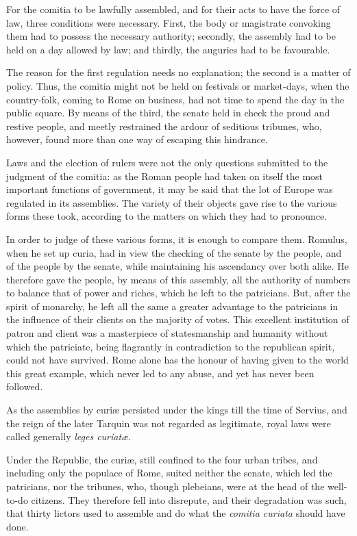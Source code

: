 \documentclass[12pt]{report}
\begin{document}
For the comitia to be lawfully assembled, and for their acts to have the force of law, three conditions were necessary. First, the body or magistrate convoking them had to possess the necessary authority; secondly, the assembly had to be held on a day allowed by law; and thirdly, the auguries had to be favourable.

The reason for the first regulation needs no explanation; the second is a matter of policy. Thus, the comitia might not be held on festivals or market-days, when the country-folk, coming to Rome on business, had not time to spend the day in the public square. By means of the third, the senate held in check the proud and restive people, and meetly restrained the ardour of seditious tribunes, who, however, found more than one way of escaping this hindrance.

Laws and the election of rulers were not the only questions submitted to the judgment of the comitia: as the Roman people had taken on itself the most important functions of government, it may be said that the lot of Europe was regulated in its assemblies. The variety of their objects gave rise to the various forms these took, according to the matters on which they had to pronounce.

In order to judge of these various forms, it is enough to compare them. Romulus, when he set up curia, had in view the checking of the senate by the people, and of the people by the senate, while maintaining his ascendancy over both alike. He therefore gave the people, by means of this assembly, all the authority of numbers to balance that of power and riches, which he left to the patricians. But, after the spirit of monarchy, he left all the same a greater advantage to the patricians in the influence of their clients on the majority of votes. This excellent institution of patron and client was a masterpiece of statesmanship and humanity without which the patriciate, being flagrantly in contradiction to the republican spirit, could not have survived. Rome alone has the honour of having given to the world this great example, which never led to any abuse, and yet has never been followed.

As the assemblies by curiæ persisted under the kings till the time of Servius, and the reign of the later Tarquin was not regarded as legitimate, royal laws were called generally \textit{leges curiatæ}.

Under the Republic, the curiæ, still confined to the four urban tribes, and including only the populace of Rome, suited neither the senate, which led the patricians, nor the tribunes, who, though plebeians, were at the head of the well-to-do citizens. They therefore fell into disrepute, and their degradation was such, that thirty lictors used to assemble and do what the \textit{comitia curiata} should have done.
\end{document}
